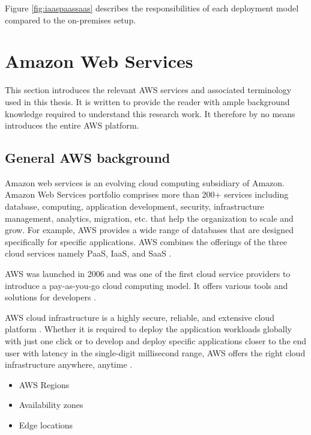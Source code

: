 \par Figure \ref{fig:iaaspaassaas} describes the responsibilities of each deployment model compared to the on-premises setup.

\section{Amazon Web Services}
\par This section introduces the relevant AWS services and associated terminology used in this thesis.
It is written to provide the reader with ample background knowledge required to understand this research work.
It therefore by no means introduces the entire AWS platform.

\subsection{General AWS background}

\par Amazon web services is an evolving cloud computing subsidiary of Amazon.
Amazon Web
Services portfolio comprises more than 200+ services
including database, computing, application
development, security, infrastructure management, analytics, migration, etc.
that help the
organization to scale and grow.
For example, AWS provides a wide range of databases that are
designed specifically for specific applications.
AWS combines the offerings of the three cloud services 
namely PaaS, IaaS, and SaaS \cite{17}.

\par AWS was launched in 2006 and was one of the first
cloud service providers to introduce a pay-as-you-go cloud computing model.
It offers various tools and solutions for developers \cite{18}.

\par AWS cloud infrastructure is a highly secure,
reliable, and extensive cloud platform \cite{19}.
Whether
it is required to deploy the application workloads
globally with just one click or to develop and deploy
specific applications closer to the end user with latency in the single-digit millisecond range, AWS offers the right cloud infrastructure anywhere, anytime \cite{20}.

\begin{itemize}
    \item AWS Regions
    \item Availability zones
    \item Edge locations
\end{itemize}

